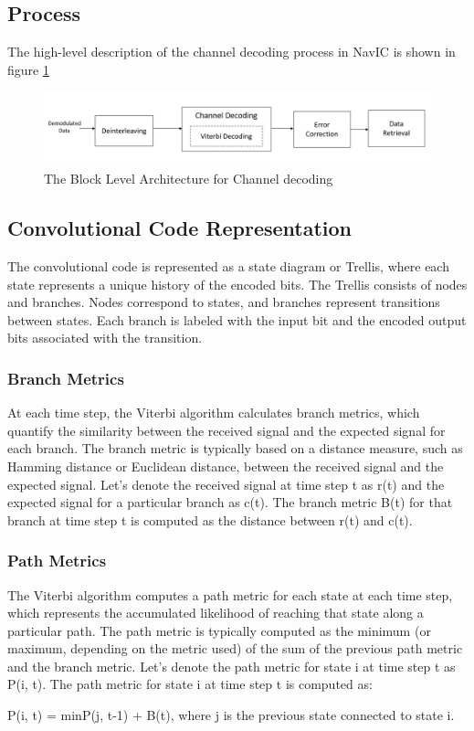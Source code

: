 \subsection{Process}
The high-level description of the channel decoding process in NavIC is shown in figure \ref{fig:decoding_r}
\begin{normalsize}
\begin{figure}[ht]
\centering
\includegraphics[width=1\columnwidth]{figs/decoding_r.jpg}
\centering
\captionsetup{justification=centering}
\caption{The Block Level Architecture for Channel decoding}
\label{fig:decoding_r}
\end{figure}
\end{normalsize}


\subsection{Convolutional Code Representation}

The convolutional code is represented as a state diagram or Trellis, where each state represents a unique history of the encoded bits.
The Trellis consists of nodes and branches. Nodes correspond to states, and branches represent transitions between states.
Each branch is labeled with the input bit and the encoded output bits associated with the transition.

\subsubsection{Branch Metrics}
At each time step, the Viterbi algorithm calculates branch metrics, which quantify the similarity between the received signal and the expected signal for each branch.
The branch metric is typically based on a distance measure, such as Hamming distance or Euclidean distance, between the received signal and the expected signal.
Let's denote the received signal at time step t as r(t) and the expected signal for a particular branch as c(t). The branch metric B(t) for that branch at time step t is computed as the distance between r(t) and c(t).

\subsubsection{Path Metrics}
The Viterbi algorithm computes a path metric for each state at each time step, which represents the accumulated likelihood of reaching that state along a particular path.
The path metric is typically computed as the minimum (or maximum, depending on the metric used) of the sum of the previous path metric and the branch metric.
Let's denote the path metric for state i at time step t as P(i, t). The path metric for state i at time step t is computed as:
\begin{center}
P(i, t) = min{P(j, t-1) + B(t)}, where j is the previous state connected to state i.
\end{center}

